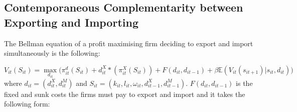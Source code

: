 \documentclass[12pt]{article}
\begin{document}
% 
% 

\newpage
\subsection{Contemporaneous Complementarity between Exporting and Importing}\label{sec:biprobit}

The Bellman equation of a profit maximising firm deciding to export
and import simultaneously  is the following:  

\begin{equation}
V_{it}(S_{it}) = \underset{d_{it}}{\max} \big(\pi_{it}^{d}(S_{it}) +d_{it}^{X}*(\pi_{it}^{X}(S_{it})) +
F(d_{it}, d_{it-1}) + \beta \mathbb{E}(V_{it}(s_{it+1})|s_{it}, d_{it}) \big)
\end{equation}
where $d_{it}= (d_{it}^X, d_{it}^M)$ and $S_{it}= (k_{it}, l_{it},
\omega_{it}, d_{it-1}^X, d_{it-1}^M)$.  $F(d_{it}, d_{it-1})$ is the
fixed and sunk costs the firms must pay to export and import and it takes the
following form:
\end{document}
